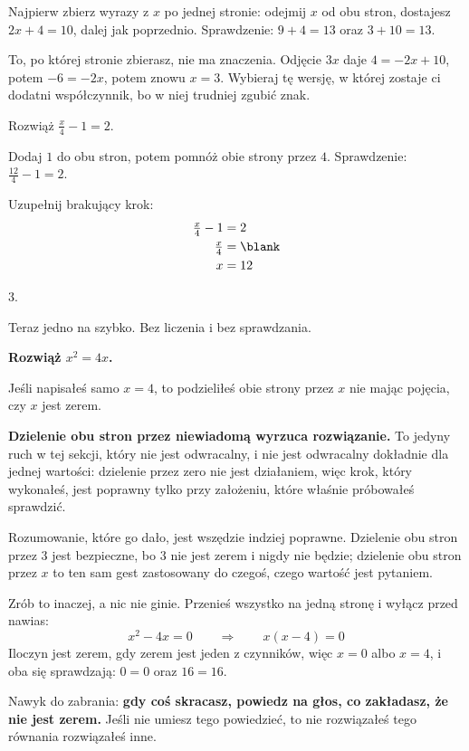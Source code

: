 \begin{fr}
Najpierw zbierz wyrazy z $x$ po jednej stronie: odejmij $x$ od obu stron,
dostajesz $2x + 4 = 10$, dalej jak poprzednio. Sprawdzenie: $9 + 4 = 13$ oraz
$3 + 10 = 13$.

To, po której stronie zbierasz, nie ma znaczenia. Odjęcie $3x$ daje
$4 = -2x + 10$, potem $-6 = -2x$, potem znowu $x = 3$. Wybieraj tę wersję, w
której zostaje ci dodatni współczynnik, bo w niej trudniej zgubić znak.

Rozwiąż $\frac{x}{4} - 1 = 2$.
\nextframe
\end{fr}

\begin{fr}
Dodaj $1$ do obu stron, potem pomnóż obie strony przez $4$. Sprawdzenie:
$\frac{12}{4} - 1 = 2$.

Uzupełnij brakujący krok:
\begin{align*}
\tfrac{x}{4} - 1 &= 2 \\
\tfrac{x}{4} &= \blank \\
x &= 12
\end{align*}
\dotline
\nextframe
\end{fr}

\begin{fr}
\begin{ansblock}
$3$.
\end{ansblock}

Teraz jedno na szybko. Bez liczenia i bez sprawdzania.

\textbf{Rozwiąż $x^{2} = 4x$.}
\dotline
\nextframe
\end{fr}

\begin{fr}
Jeśli napisałeś samo $x = 4$, to podzieliłeś obie strony przez $x$ \dash{} nie
mając pojęcia, czy $x$ jest zerem.

\begin{trapbox}
\textbf{Dzielenie obu stron przez niewiadomą wyrzuca rozwiązanie.} To jedyny
ruch w tej sekcji, który nie jest odwracalny, i nie jest odwracalny dokładnie
dla jednej wartości: dzielenie przez zero nie jest działaniem, więc krok, który
wykonałeś, jest poprawny tylko przy założeniu, które właśnie próbowałeś
sprawdzić.

Rozumowanie, które go dało, jest wszędzie indziej poprawne. Dzielenie obu
stron przez $3$ jest bezpieczne, bo $3$ nie jest zerem i nigdy nie będzie;
dzielenie obu stron przez $x$ to ten sam gest zastosowany do czegoś, czego
wartość jest pytaniem.

Zrób to inaczej, a nic nie ginie. Przenieś wszystko na jedną stronę i wyłącz
przed nawias:
\[ x^{2} - 4x = 0 \qquad\Longrightarrow\qquad x(x - 4) = 0 \]
Iloczyn jest zerem, gdy zerem jest jeden z czynników, więc $x = 0$ albo
$x = 4$, i oba się sprawdzają: $0 = 0$ oraz $16 = 16$.

Nawyk do zabrania: \textbf{gdy coś skracasz, powiedz na głos, co zakładasz, że
nie jest zerem.} Jeśli nie umiesz tego powiedzieć, to nie rozwiązałeś tego
równania \dash{} rozwiązałeś inne.
\end{trapbox}
\end{fr}

